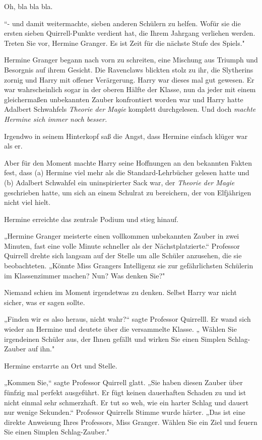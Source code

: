 {Oh, bla bla bla.

“- und damit weitermachte, sieben anderen Schülern zu helfen. Wofür sie die ersten sieben Quirrell-Punkte verdient hat, die Ihrem Jahrgang verliehen werden. Treten Sie vor, Hermine Granger. Es ist Zeit für die nächste Stufe des Spiels."

Hermine Granger begann nach vorn zu schreiten, eine Mischung aus Triumph und Besorgnis auf ihrem Gesicht. Die Ravenclaws blickten stolz zu ihr, die Slytherins zornig und Harry mit offener Verärgerung. Harry war dieses mal gut gewesen. Er war wahrscheinlich sogar in der oberen Hälfte der Klasse, nun da jeder mit einem gleichermaßen unbekannten Zauber konfrontiert worden war und Harry hatte Adalbert Schwahfels \emph{Theorie der Magie} komplett durchgelesen. Und doch \emph{machte Hermine sich immer noch besser.}

Irgendwo in seinem Hinterkopf saß die Angst, dass Hermine einfach klüger war als er.

Aber für den Moment machte Harry seine Hoffnungen an den bekannten Fakten fest, dass (a) Hermine viel mehr als die Standard-Lehrbücher gelesen hatte und (b) Adalbert Schwahfel ein uninspirierter Sack war, der \emph{Theorie der Magie} geschrieben hatte, um sich an einem Schulrat zu bereichern, der von Elfjährigen nicht viel hielt.

Hermine erreichte das zentrale Podium und stieg hinauf.

„Hermine Granger meisterte einen vollkommen unbekannten Zauber in zwei Minuten, fast eine volle Minute schneller als der Nächstplatzierte.“ Professor Quirrell drehte sich langsam auf der Stelle um alle Schüler anzusehen, die sie beobachteten. „Könnte Miss Grangers Intelligenz sie zur gefährlichsten Schülerin im Klassenzimmer machen? Nun? Was denken Sie?"

Niemand schien im Moment irgendetwas zu denken. Selbst Harry war nicht sicher, was er sagen sollte.

„Finden wir es also heraus, nicht wahr?“ sagte Professor Quirrelll. Er wand sich wieder an Hermine und deutete über die versammelte Klasse. „ Wählen Sie irgendeinen Schüler aus, der Ihnen gefällt und wirken Sie einen Simplen Schlag-Zauber auf ihn."

Hermine erstarrte an Ort und Stelle.

„Kommen Sie,“ sagte Professor Quirrell glatt. „Sie haben diesen Zauber über fünfzig mal perfekt ausgeführt. Er fügt keinen dauerhaften Schaden zu und ist nicht einmal sehr schmerzhaft. Er tut so weh, wie ein harter Schlag und dauert nur wenige Sekunden.“ Professor Quirrells Stimme wurde härter. „Das ist eine direkte Anweisung Ihres Professors, Miss Granger. Wählen Sie ein Ziel und feuern Sie einen Simplen Schlag-Zauber."

}

